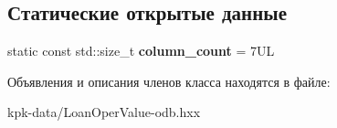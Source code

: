 \subsection*{Статические открытые данные}
\begin{DoxyCompactItemize}
\item 
static const std\+::size\+\_\+t {\bfseries column\+\_\+count} = 7\+UL\hypertarget{classodb_1_1access_1_1composite__value__traits_3_01_1_1kpk_1_1data_1_1_loan_oper_value_00_01id__pgsql_01_4_ae7a54d20ec0fe1a8e176b0cebd1d6cca}{}\label{classodb_1_1access_1_1composite__value__traits_3_01_1_1kpk_1_1data_1_1_loan_oper_value_00_01id__pgsql_01_4_ae7a54d20ec0fe1a8e176b0cebd1d6cca}

\end{DoxyCompactItemize}


Объявления и описания членов класса находятся в файле\+:\begin{DoxyCompactItemize}
\item 
kpk-\/data/Loan\+Oper\+Value-\/odb.\+hxx\end{DoxyCompactItemize}
